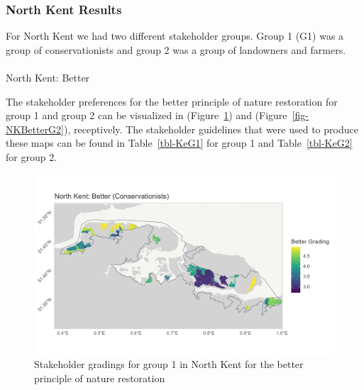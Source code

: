 \documentclass[
  12pt,
  letterpaper,
  DIV=11,
  numbers=noendperiod]{scrartcl}
\makeatletter
\let\oldparagraph\paragraph
\renewcommand{\paragraph}{
    \@ifstar
      \xxxParagraphStar
      \xxxParagraphNoStar
  }
\newcommand{\xxxParagraphStar}[1]{\oldparagraph*{#1}\mbox{}}
\newcommand{\xxxParagraphNoStar}[1]{\oldparagraph{#1}\mbox{}}
\makeatother
\begin{document}
\newpage{}

\subsubsection{North Kent Results}\label{north-kent-results}

For North Kent we had two different stakeholder groups. Group 1 (G1) was
a group of conservationists and group 2 was a group of landowners and
farmers.

\paragraph{North Kent: Better}\label{north-kent-better}

The stakeholder preferences for the better principle of nature
restoration for group 1 and group 2 can be visualized in
(Figure~\ref{fig-NKBetterG1}) and (Figure~\ref{fig-NKBetterG2}),
receptively. The stakeholder guidelines that were used to produce these
maps can be found in Table~\ref{tbl-KeG1} for group 1 and
Table~\ref{tbl-KeG2} for group 2.

\begin{figure}[H]

\includegraphics[width=7.29167in,height=\textheight]{Plots/NorthKent_G1_Better.png}

\caption{\label{fig-NKBetterG1}Stakeholder gradings for group 1 in North
Kent for the better principle of nature restoration}

\end{figure}%
\end{document}
